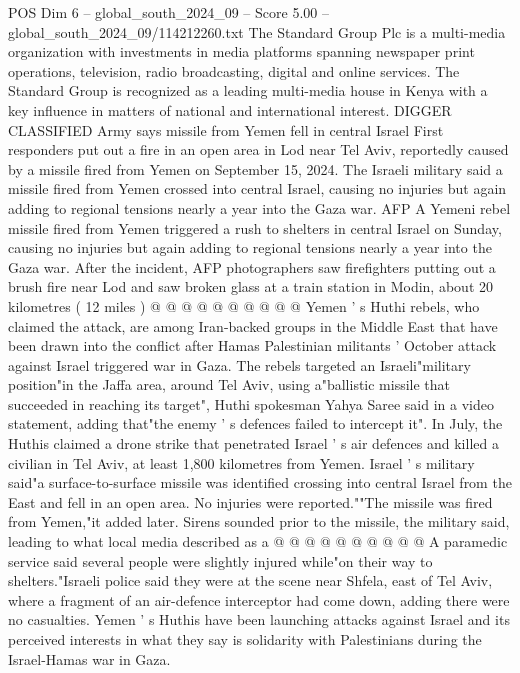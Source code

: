\begin{textsample}{POS Dim 6 – global\_south\_2024\_09 – Score 5.00 – global\_south\_2024\_09/114212260.txt}  \label{ex:f6_pos_419}
The Standard Group Plc is a multi-media organization with investments in media platforms spanning newspaper print operations, television, radio broadcasting, digital and online services.
The Standard Group is recognized as a leading multi-media house in Kenya with a key influence in matters of national and international interest.
DIGGER CLASSIFIED Army says missile from Yemen fell in central Israel First responders put out a fire in an open area in Lod near Tel Aviv, reportedly caused by a missile fired from Yemen on September 15, 2024.
The Israeli military said a missile fired from Yemen crossed into central Israel, causing no injuries but again adding to regional tensions nearly a year into the Gaza war.
AFP A Yemeni rebel missile fired from Yemen triggered a rush to shelters in central Israel on Sunday, causing no injuries but again adding to regional tensions nearly a year into the Gaza war.
After the incident, AFP photographers saw firefighters putting out a brush fire near Lod and saw broken glass at a train station in Modin, about 20 kilometres ( 12 miles ) @ @ @ @ @ @ @ @ @ @ Yemen ' s Huthi rebels, who claimed the attack, are among Iran-backed groups in the Middle East that have been drawn into the conflict after Hamas Palestinian militants ' October attack against Israel triggered war in Gaza.
The rebels targeted an Israeli"military position"in the Jaffa area, around Tel Aviv, using a"ballistic missile that succeeded in reaching its target", Huthi spokesman Yahya Saree said in a video statement, adding that"the enemy ' s defences failed to intercept it".
In July, the Huthis claimed a drone strike that penetrated Israel ' s air defences and killed a civilian in Tel Aviv, at least 1,800 kilometres from Yemen.
Israel ' s military said"a surface-to-surface missile was identified crossing into central Israel from the East and fell in an open area.
No injuries were reported.""The missile was fired from Yemen,"it added later.
Sirens sounded prior to the missile, the military said, leading to what local media described as a @ @ @ @ @ @ @ @ @ @ A paramedic service said several people were slightly injured while"on their way to shelters."Israeli police said they were at the scene near Shfela, east of Tel Aviv, where a fragment of an air-defence interceptor had come down, adding there were no casualties.
Yemen ' s Huthis have been launching attacks against Israel and its perceived interests in what they say is solidarity with Palestinians during the Israel-Hamas war in Gaza.

\end{textsample}
